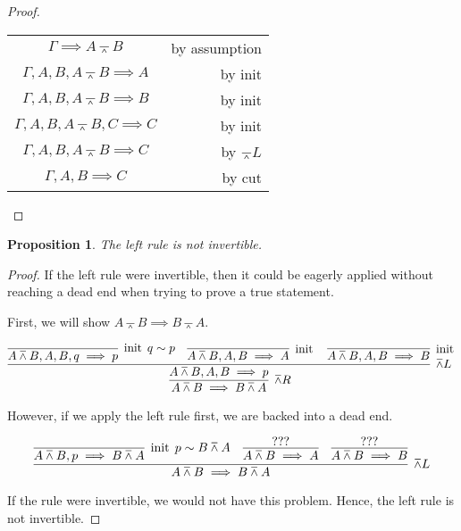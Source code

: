 \documentclass[letterpaper,11pt]{article}
\newtheorem{prop}{Proposition}
\newcommand{\seq}{\implies}
\newcommand{\nand}{\barwedge}
\DeclareMathOperator{\initOp}{init}
\newcommand{\init}{\initOp{}}
\begin{document}
\begin{proof} ~

    \begin{center}
        \begin{tabular}{c r}
            $\Gamma \seq A \nand B$
            &
            by assumption \\
            $\Gamma, A, B, A \nand B \seq A$
            &
            by init \\
            $\Gamma, A, B, A \nand B \seq B$
            &
            by init \\
            $\Gamma, A, B, A \nand B, C \seq C$
            &
            by init \\
            $\Gamma, A, B, A \nand B \seq C$
            &
            by $\nand L$ \\
            $\Gamma, A, B \seq C$
            &
            by cut
        \end{tabular}
    \end{center}
\end{proof}

\begin{prop}
    The left rule is not invertible.
\end{prop}

\begin{proof}
    If the left rule were invertible, then it could be eagerly applied without
    reaching a dead end when trying to prove a true statement.

    First, we will show $A \nand B \seq B \nand A$.

    \begin{equation*}
        \infer[\nand R]{A \nand B \seq B \nand A}{
            \infer[\nand L]{A \nand B, A, B \seq p}{
                \infer[\init\; q \sim p]{A \nand B, A, B, q \seq p}{}
                &
                \infer[\init]{A \nand B, A, B \seq A}{}
                &
                \infer[\init]{A \nand B, A, B \seq B}{}
            }
        }
    \end{equation*}

    However, if we apply the left rule first, we are backed into a dead end.

    \begin{equation*}
        \infer[\nand L]{A \nand B \seq B \nand A}{
            \infer[\init\; p \sim B \nand A]{A \nand B, p \seq B \nand A}{}
            &
            \infer{A \nand B \seq A}{???}
            &
            \infer{A \nand B \seq B}{???}
        }
    \end{equation*}

    If the rule were invertible, we would not have this problem. Hence, the
    left rule is not invertible.
\end{proof}
\end{document}

